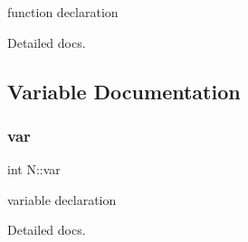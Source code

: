 function declaration 

Detailed docs. 

\subsection{Variable Documentation}
\mbox{\label{namespace_n_a406e233433deabc7b1612470373d53e0}} 
\subsubsection{\texorpdfstring{var}{var}}
{\footnotesize\ttfamily int N\+::var}



variable declaration 

Detailed docs. 